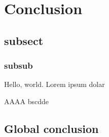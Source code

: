\chapter{Conclusion}
\section{subsect}
\subsection{subsub}
Hello, world.
Lorem ipsum dolar

AAAA bscdde

\subsection{}

\section{Global conclusion}
